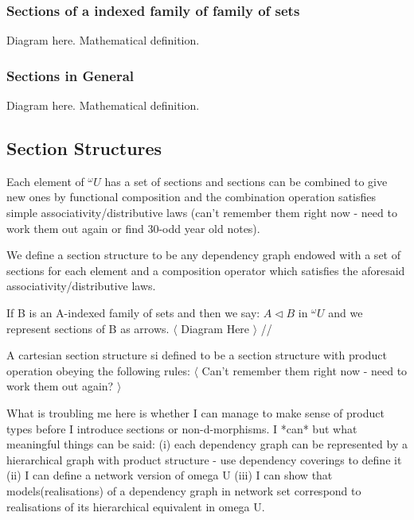 \documentclass[10pt,a4paper]{scrartcl}
\begin{document}
\subsubsection{Sections of a indexed family of family of sets}
Diagram here.
Mathematical definition.
\subsubsection{Sections in General}
Diagram here.
Mathematical definition.

\subsection{Section Structures}
Each element of $^\omega U$ has a set of sections and sections can be combined to give new ones by functional composition and the combination operation satisfies simple associativity/distributive laws (can't remember them right now - need to work them out again or find 30-odd year old notes).

We define a section structure to be any dependency graph endowed with a set of sections for each element and a composition operator which satisfies the aforesaid associativity/distributive laws.

If B is an A-indexed family of sets and then we say: $A \triangleleft B$ in $^\omega U$ and we represent sections of B as arrows.
$\langle$ Diagram Here $\rangle$
//

\noindent A cartesian section structure si defined to be a section structure with product operation obeying the following rules:
$\langle$ Can't remember them right now - need to work them out again? $\rangle$

\noindent What is troubling me here is whether I can manage to make sense of product types before I introduce sections or non-d-morphisms. I *can* but what meaningful things can be said: (i) each dependency graph can be represented by a hierarchical graph with product structure - use dependency coverings to define it (ii) I can define a network version of 
omega U (iii) I can show that models(realisations) of a dependency graph in network set correspond to realisations of its hierarchical equivalent in omega U.
  
  

\end{document}
